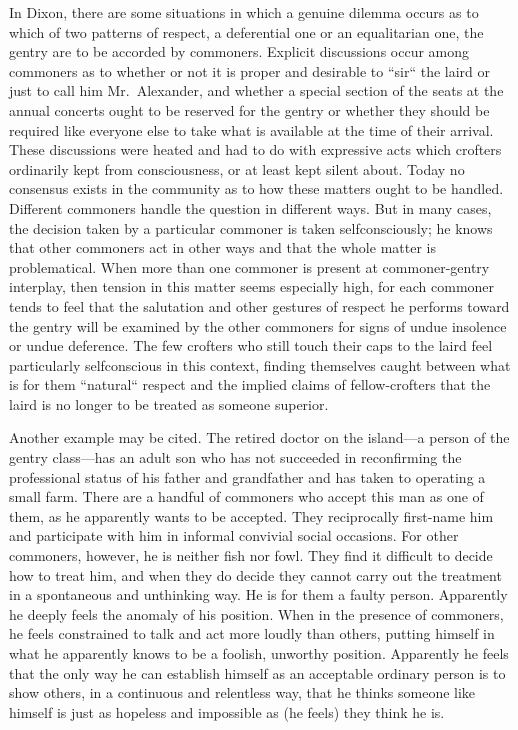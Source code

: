 \documentclass[openany,nobib]{tufte-book}
\begin{document}
In Dixon, there are some situations in which a genuine dilemma occurs as
to which of two patterns of respect, a deferential one or an
equalitarian one, the gentry are to be accorded by commoners. Explicit
discussions occur among commoners as to whether or not it is proper and
desirable to ``sir`` the laird or just to call him Mr.~Alexander, and
whether a special section of the seats at the annual concerts ought to
be reserved for the gentry or whether they should be required like
everyone else to take what is available at the time of their arrival.
These discussions were heated and had to do with expressive acts which
crofters ordinarily kept from consciousness, or at least kept silent
about. Today no consensus exists in the community as to how these
matters ought to be handled. Different commoners handle the question in
different ways. But in many cases, the decision taken by a particular
commoner is taken selfconsciously; he knows that other commoners act in
other ways and that the whole matter is problematical. When more than
one commoner is present at commoner-gentry interplay, then tension in
this matter seems especially high, for each commoner tends to feel that
the salutation and other gestures of respect he performs toward the
gentry will be examined by the other commoners for signs of undue
insolence or undue deference. The few crofters who still touch their
caps to the laird feel particularly selfconscious in this context,
finding themselves caught between what is for them ``natural`` respect
and the implied claims of fellow-crofters that the laird is no longer to
be treated as someone superior.

\enlargethispage{\baselineskip}

Another example may be cited. The retired doctor on the island---a
person of the gentry class---has an adult son who has not succeeded in
reconfirming the professional status of his father and grandfather and
has taken to operating a small farm. There are a handful of commoners
who accept this man as one of them, as he apparently wants to be
accepted. They reciprocally first-name him and participate with him in
informal convivial social occasions. For other commoners, however, he is
neither fish nor fowl. They find it difficult to decide how to treat
him, and when they do decide they cannot carry out the treatment in a
spontaneous and unthinking way. He is for them a faulty person.
Apparently he deeply feels the anomaly of his position. When in the
presence of commoners, he feels constrained to talk and act more loudly
than others, putting himself in what he apparently knows to be a
foolish, unworthy position. Apparently he feels that the only way he can
establish himself as an acceptable ordinary person is to show others, in
a continuous and relentless way, that he thinks someone like himself is
just as hopeless and impossible as (he feels) they think he is.
\end{document}
